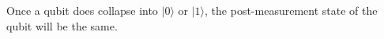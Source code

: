 \documentclass[preview]{standalone}
\begin{document}
\begin{center}
Once a qubit does collapse into $| 0 \rangle$ or $| 1 \rangle$, the post-measurement state of the qubit will be the same.
\end{center}
\end{document}

